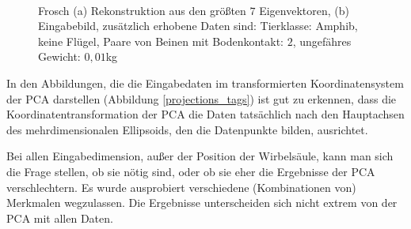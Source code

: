 \begin{figure}
  \centering
  \\
  
  \caption{Frosch (a) Rekonstruktion aus den größten $7$ Eigenvektoren, (b) Eingabebild, zusätzlich erhobene Daten sind:
  Tierklasse: Amphib, keine Flügel, Paare von Beinen mit Bodenkontakt: $2$, ungefähres Gewicht: $0,01$kg}
  \label{frosch}
 \end{figure}
 

 In den Abbildungen, die die Eingabedaten im transformierten Koordinatensystem der PCA darstellen (Abbildung \ref{projections_tags}) ist gut zu erkennen, dass die Koordinatentransformation der PCA die Daten tatsächlich nach den Hauptachsen des mehrdimensionalen Ellipsoids, den die Datenpunkte bilden, ausrichtet.

 Bei allen Eingabedimension, außer der Position der Wirbelsäule, kann man sich die Frage stellen, ob sie nötig sind, oder ob sie eher die Ergebnisse der PCA verschlechtern. Es wurde ausprobiert verschiedene (Kombinationen von) Merkmalen wegzulassen. Die Ergebnisse unterscheiden sich nicht extrem von der PCA mit allen Daten. 
 
